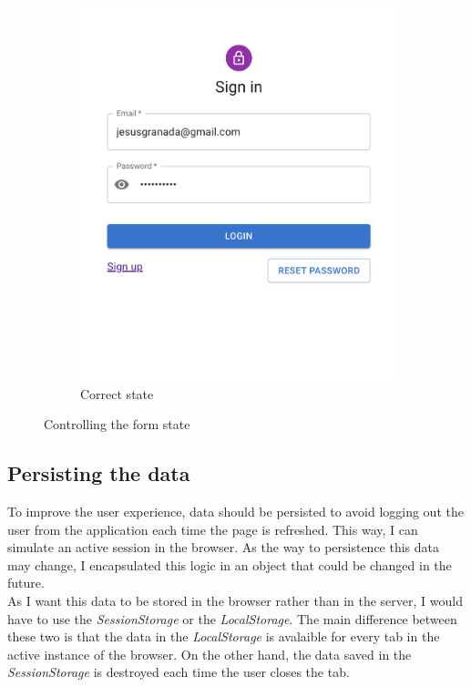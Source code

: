 \begin{figure}[H]
\begin{subfigure}[T]{0.49\textwidth}
                \includegraphics[width=\textwidth]{assets/form_correct.png}
                \caption{Correct state}
                \label{fig:impl_form_correct}
            \end{subfigure}
            \caption{Controlling the form state}
            \label{fig:impl_form}
        \end{figure}

    \subsection{Persisting the data}
        To improve the user experience, data should be persisted to avoid logging out the user from the application each time the page is refreshed.
        This way, I can simulate an active session in the browser. 
        As the way to persistence this data may change, I encapsulated this logic in an object that could be changed in the future. \\

        As I want this data to be stored in the browser rather than in the server, I would have to use the \textit{SessionStorage} or the \textit{LocalStorage}. 
        The main difference between these two is that the data in the \textit{LocalStorage} is avalaible for every tab in the active instance of the browser. On the 
        other hand, the data saved in the \textit{SessionStorage} is destroyed each time the user closes the tab. \\

